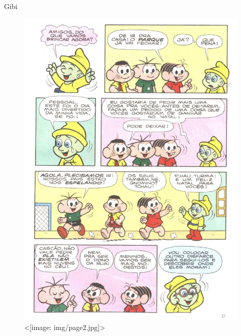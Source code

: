 \documentclass{beamer}
\def\texttt#1{<#1>}%
\begin{document}
\begin{frame}{Gibi}
\begin{figure}
    \centering
    \includegraphics[scale = 0.25]{img/page.pdf}
    \texttt{[image: img/page2.jpg]}
\end{figure}
\end{frame}
\end{document}
